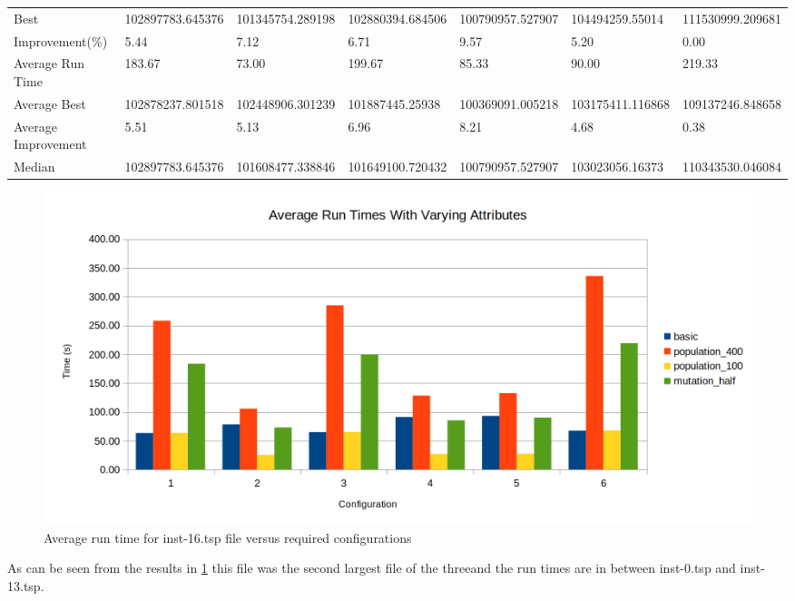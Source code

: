 \begin{table}[H]
{\begin{tabular}{lllllll}
\cellcolor[HTML]{ECF4FF}Best                & 102897783.645376 & 101345754.289198 & 102880394.684506 & 100790957.527907 & 104494259.55014  & 111530999.209681 \\
\cellcolor[HTML]{ECF4FF}Improvement(\%)     & 5.44             & 7.12             & 6.71             & 9.57             & 5.20             & 0.00             \\
\rowcolor[HTML]{CBCEFB} 
\cellcolor[HTML]{DAE8FC}Average Run Time    & 183.67           & 73.00            & 199.67           & 85.33            & 90.00            & 219.33           \\
\rowcolor[HTML]{CBCEFB} 
\cellcolor[HTML]{DAE8FC}Average Best        & 102878237.801518 & 102448906.301239 & 101887445.25938  & 100369091.005218 & 103175411.116868 & 109137246.848658 \\
\rowcolor[HTML]{CBCEFB} 
\cellcolor[HTML]{DAE8FC}Average Improvement & 5.51             & 5.13             & 6.96             & 8.21             & 4.68             & 0.38             \\
\rowcolor[HTML]{CBCEFB} 
\cellcolor[HTML]{DAE8FC}Median              & 102897783.645376 & 101608477.338846 & 101649100.720432 & 100790957.527907 & 103023056.16373  & 110343530.046084
\end{tabular}%
}
\end{table}

\begin{figure}[H]
\vspace{-5pt}
\centering
\includegraphics[width=1.0\textwidth]{images/inst-16run-time.png}
\caption{\label{fig:inst-16-run-time}Average run time for inst-16.tsp file versus required configurations}
\end{figure}

As can be seen from the results in \ref{fig:inst-16-run-time} this file was the second largest file of the threeand the run times are in between inst-0.tsp and inst-13.tsp.

